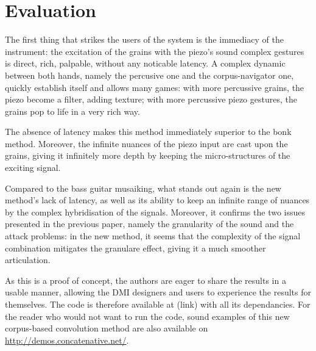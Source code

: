 \section{Evaluation}\label{sec:eval}

The first thing that strikes the users of the system is the immediacy of the instrument: the excitation of the grains with the piezo's sound complex gestures is direct, rich, palpable, without any noticable latency. A complex dynamic between both hands, namely the percusive one and the corpus-navigator one, quickly establish itself and allows many games: with more percussive grains, the piezo become a filter, adding texture; with more percussive piezo gestures, the grains pop to life in a very rich way.

The absence of latency makes this method immediately superior to the bonk~ method. Moreover, the infinite nuances of the piezo input are cast upon the grains, giving it infinitely more depth by keeping the micro-structures of the exciting signal.

Compared to the bass guitar musaiking, what stands out again is the new method's lack of latency, as well as its ability to keep an infinite range of nuances by the complex hybridisation of the signals. Moreover, it confirms the two issues presented in the previous paper, namely the granularity of the sound and the attack problems: in the new method, it seems that the complexity of the signal combination mitigates the granulare effect, giving it a much smoother articulation.

As this is a proof of concept, the authors are eager to share the results in a usable manner, allowing the DMI designers and users to experience the results for themselves. The code is therefore available at (link) with all its dependancies. For the reader who would not want to run the code, sound examples of this new corpus-based convolution method are also available on \url{http://demos.concatenative.net/}.
